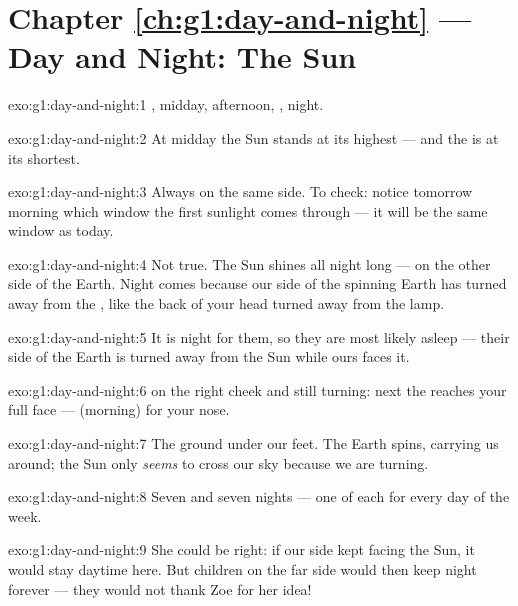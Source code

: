 \section*{Chapter \ref{ch:g1:day-and-night} --- Day and Night: The Sun}

\begin{solution}{exo:g1:day-and-night:1}
, midday, afternoon, , night.
\end{solution}

\begin{solution}{exo:g1:day-and-night:2}
At midday the Sun stands at its highest --- and the  is at its
shortest.
\end{solution}

\begin{solution}{exo:g1:day-and-night:3}
Always on the same side. To check: notice tomorrow morning which
window the first sunlight comes through --- it will be the same
window as today.
\end{solution}

\begin{solution}{exo:g1:day-and-night:4}
Not true. The Sun shines all night long --- on the other side of the
Earth. Night comes because our side of the spinning Earth has turned
away from the , like the back of your head turned away from the
lamp.
\end{solution}

\begin{solution}{exo:g1:day-and-night:5}
It is night for them, so they are most likely asleep --- their side
of the Earth is turned away from the Sun while ours faces it.
\end{solution}

\begin{solution}{exo:g1:day-and-night:6}
 on the right cheek and still turning: next the  reaches
your full face ---  (morning) for your nose.
\end{solution}

\begin{solution}{exo:g1:day-and-night:7}
The ground under our feet. The Earth spins, carrying us around; the
Sun only \emph{seems} to cross our sky because we are turning.
\end{solution}

\begin{solution}{exo:g1:day-and-night:8}
Seven  and seven nights --- one of each for every day of the
week.
\end{solution}

\begin{solution}{exo:g1:day-and-night:9}
She could be right: if our side kept facing the Sun, it would stay
daytime here. But children on the far side would then keep night
forever --- they would not thank Zoe for her idea!
\end{solution}
